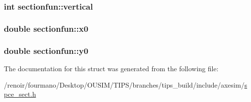 \hypertarget{structsectionfun_aab0c499ac5e7d8871f5d88560f01e5ba}{
\subsubsection[{vertical}]{\setlength{\rightskip}{0pt plus 5cm}int {\bf sectionfun::vertical}}}
\label{structsectionfun_aab0c499ac5e7d8871f5d88560f01e5ba}
\hypertarget{structsectionfun_a57e89a384211c3074227a9b459be3c4f}{
\subsubsection[{x0}]{\setlength{\rightskip}{0pt plus 5cm}double {\bf sectionfun::x0}}}
\label{structsectionfun_a57e89a384211c3074227a9b459be3c4f}
\hypertarget{structsectionfun_a6c35eb6e4aca39e7448423712e1179f2}{
\subsubsection[{y0}]{\setlength{\rightskip}{0pt plus 5cm}double {\bf sectionfun::y0}}}
\label{structsectionfun_a6c35eb6e4aca39e7448423712e1179f2}


The documentation for this struct was generated from the following file:\begin{DoxyCompactItemize}
\item 
/renoir/fourmano/Desktop/OUSIM/TIPS/branches/tips\_\-build/include/axesim/\hyperlink{spce__sect_8h}{spce\_\-sect.h}\end{DoxyCompactItemize}
